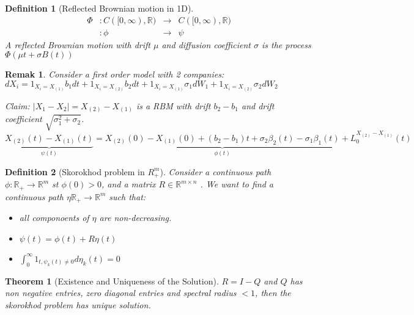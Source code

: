 \documentclass{article} \usepackage[utf8]{inputenc}
\newtheorem{theorem}{Theorem}
\newtheorem{definition}{Definition}
\newtheorem{remark}{Remak}
\begin{document}
  \begin{definition}[Reflected Brownian motion in 1D]
    \begin{align*}
      \Phi & : C([0, \infty), \mathbb R) &\longrightarrow &C([0, \infty), \mathbb R)\\
           & : \phi &\longrightarrow & \psi 
    \end{align*}
    A reflected Brownian motion with drift $\mu$ and diffusion coefficient $\sigma$ is the process $\Phi(\mu t + \sigma B(t))$
  \end{definition}
  \begin{remark}

    Consider a first order model with 2 companies:
    $dX_i = 1_{X_i = X_(1)} b_1 dt + 1_{X_i = X_(2)} b_2 dt + 1_{X_i = X_(1)} \sigma_1 dW_1 + 1_{X_i = X_(2)} \sigma_2 dW_2$

    Claim: $|X_1 - X_2| = X_{(2)} - X_{(1)}$ is a RBM with drift $b_2 - b_1$ and drift coefficient $\sqrt{\sigma_1^2 + \sigma_2}$.
    $\underbrace{X_{(2)}(t) - X_{(1)}(t)}_{\psi(t)} = \underbrace{X_{(2)}(0) - X_{(1)}(0) + (b_2 - b_1)t + \sigma_2 \beta_2(t) - \sigma_1 \beta_1(t)}_{\phi(t)} + L_0^{X_{(2)} - X_{(1)}}(t)$
    
  \end{remark}
  \begin{definition}[Skorokhod problem in $R_+^m$]
    Consider a continuous path $\phi: \mathbb R_+ \rightarrow \mathbb R^m$ st $\phi(0) > 0$, and a matrix $R \in \mathbb R^{m \times n}$
    . We want to find a continuous path $\eta \mathbb R_+ \rightarrow \mathbb R^m$ such that:
    \begin{itemize}
    \item all componoents of $\eta$ are non-decreasing.
    \item $\psi(t) = \phi(t) + R \eta(t)$
    \item  $\int_0^{\infty} 1_{t, \psi_k(t) \ne 0} d\eta_k(t) = 0$
    \end{itemize}
  \end{definition}
  \begin{theorem}[Existence and Uniqueness of the Solution]
    $R = I - Q$ and $Q$ has non negative entries, zero diagonal entries and spectral radius $<1$, then the skorokhod problem has unique solution. 
  \end{theorem}
\end{document}
